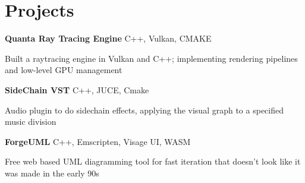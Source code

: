 
\newenvironment{twocolentry_proj}[2][]{
    \onecolentry
    \def\secondColumn{#2}
    \setcolumnwidth{\fill, 7 cm}
    \begin{paracol}{2}
}{
    \switchcolumn \raggedleft \secondColumn
    \end{paracol}
    \endonecolentry
} %

\vspace{5 pt - 0.5 cm}
\section{Projects}
\vspace{0.2 cm}
\begin{twocolentry_proj}{
    \mbox{}%
}
\fontsize{11 pt}{11 pt}\textbf{Quanta Ray Tracing Engine} C++, Vulkan, CMAKE
\end{twocolentry_proj}
\begin{onecolentry}
    \begin{highlights}
        \item Built a raytracing engine in Vulkan and C++; implementing rendering pipelines and low-level GPU management
    \end{highlights}
\end{onecolentry}

\begin{twocolentry_proj}{
    \mbox{}%
}
\fontsize{11 pt}{11 pt}\textbf{SideChain VST} C++, JUCE, Cmake
\end{twocolentry_proj}

\begin{onecolentry}
    \begin{highlights}
        \item Audio plugin to do sidechain effects, applying the visual graph to a specified music division
    \end{highlights}
\end{onecolentry}

\vspace{0.10 cm}
\begin{twocolentry_proj}{
    \mbox{}%
}
\fontsize{11 pt}{11 pt}\textbf{ForgeUML} C++, Emscripten, Visage UI, WASM
\end{twocolentry_proj}
\begin{onecolentry}
    \begin{highlights}
        \item Free web based UML diagramming tool for fast iteration that doesn't look like it was made in the early 90s
    \end{highlights}
\end{onecolentry}
